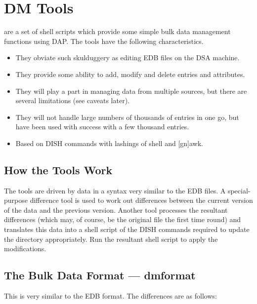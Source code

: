 \chapter{DM Tools}
\label{DUA:dmtools}

 are a set of shell scripts which provide some simple bulk
data management functions using DAP.  The tools have the following
characteristics.

\begin {itemize}
\item They obviate such skulduggery as
editing EDB files on the DSA machine.
\item They provide some ability to add, modify and delete entries and
attributes.
\item They will play a part in managing data from multiple sources, but
there are several limitations (see caveats later).
\item They will not handle large numbers of thousands of entries in one go,
but have been used with success with a few thousand entries.
\item Based on DISH commands with lashings of shell and [gn]awk.
\end{itemize}

\section {How the Tools Work}

The tools are driven by data in a syntax very similar to the EDB files.  A
special-purpose difference tool is used to work out differences between the
current version of the data and the previous version.  Another tool
processes the resultant differences (which may, of course, be the original
file the first time round) and translates this data into a shell script of
the DISH commands required to update the directory appropriately.  Run the
resultant shell script to apply the modifications.

\section {The Bulk Data Format --- dmformat}

This is very similar to the EDB format.  The differences are as follows:\\

